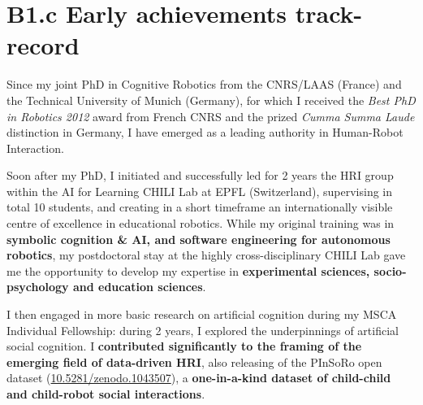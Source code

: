 \documentclass[11pt,a4paper]{report}
\newcommand{\eu}[1]{}
\begin{document}
\newpage
\chapter{B1.c Early achievements track-record}\label{early-achievements-track-record}

\eu{should list your important achievements,
including your most important publications (up to five for Starting Grant and up to ten for
Consolidator Grant) highlighting those as main author and/or without the co-authorship of your PhD
supervisor. The publications should be properly referenced, including all authors in the published
order (Please see section 1.1 on Research integrity). Field relevant bibliometric indicators as well as
research monographs and any translations thereof may also be included. If applicable include:
granted patent(s); invited presentations to internationally established conferences and/or
international advanced schools; Prizes/Awards/Academy memberships etc.}
\eu{(max 2 pages)}

Since my joint PhD in Cognitive Robotics from the CNRS/LAAS (France) and the
Technical University of Munich (Germany), for which I received the \emph{Best
PhD in Robotics 2012} award from French CNRS and the prized \emph{Cumma Summa
Laude} distinction in Germany, I have emerged as a leading authority in
Human-Robot Interaction.

Soon after my PhD, I initiated and successfully led for 2 years the HRI group
within the AI for Learning CHILI Lab at EPFL (Switzerland), supervising in total
10 students, and creating in a short timeframe an internationally visible centre
of excellence in educational robotics. While my original training was in
\textbf{symbolic cognition \& AI, and software engineering for autonomous
robotics}, my postdoctoral stay at the highly cross-disciplinary CHILI Lab gave
me the opportunity to develop my expertise in \textbf{experimental sciences,
socio-psychology and education sciences}.

I then engaged in more basic research on artificial cognition during my MSCA
Individual Fellowship: during 2 years, I explored the underpinnings of
artificial social cognition. I \textbf{contributed significantly to the framing
of the emerging field of data-driven HRI}, also releasing of the PInSoRo open
dataset (\href{https://doi.org/10.5281/zenodo.1043507}{10.5281/zenodo.1043507}),
a \textbf{one-in-a-kind dataset of child-child and child-robot social
interactions}.
\end{document}
